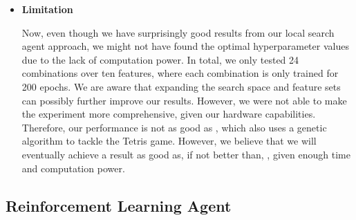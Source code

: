 \documentclass[letterpaper]{article} %
\begin{document}
\begin{itemize}
\item \textbf{Limitation}

  Now, even though we have surprisingly good results from our local search agent approach, we might not have found the optimal hyperparameter values due to the lack of computation power. In total, we only tested 24 combinations over ten features, where each combination is only trained for 200 epochs. We are aware that expanding the search space and feature sets can possibly further improve our results. However, we were not able to make the experiment more comprehensive, given our hardware capabilities. Therefore, our performance is not as good as , which also uses a genetic algorithm to tackle the Tetris game. However, we believe that we will eventually achieve a result as good as, if not better than, , given enough time and computation power.
\end{itemize}

\subsection{Reinforcement Learning Agent}
\end{document}
